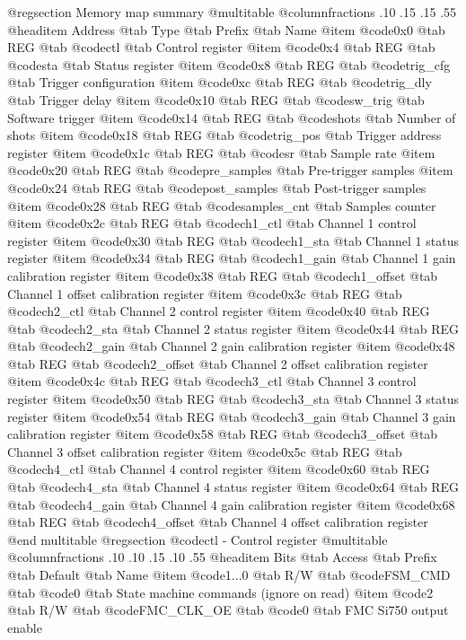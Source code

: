 @regsection Memory map summary
@multitable  @columnfractions .10 .15 .15 .55
@headitem Address @tab Type @tab Prefix @tab Name
@item @code{0x0} @tab
REG @tab
@code{ctl} @tab
Control register
@item @code{0x4} @tab
REG @tab
@code{sta} @tab
Status register
@item @code{0x8} @tab
REG @tab
@code{trig_cfg} @tab
Trigger configuration
@item @code{0xc} @tab
REG @tab
@code{trig_dly} @tab
Trigger delay
@item @code{0x10} @tab
REG @tab
@code{sw_trig} @tab
Software trigger
@item @code{0x14} @tab
REG @tab
@code{shots} @tab
Number of shots
@item @code{0x18} @tab
REG @tab
@code{trig_pos} @tab
Trigger address register
@item @code{0x1c} @tab
REG @tab
@code{sr} @tab
Sample rate
@item @code{0x20} @tab
REG @tab
@code{pre_samples} @tab
Pre-trigger samples
@item @code{0x24} @tab
REG @tab
@code{post_samples} @tab
Post-trigger samples
@item @code{0x28} @tab
REG @tab
@code{samples_cnt} @tab
Samples counter
@item @code{0x2c} @tab
REG @tab
@code{ch1_ctl} @tab
Channel 1 control register
@item @code{0x30} @tab
REG @tab
@code{ch1_sta} @tab
Channel 1 status register
@item @code{0x34} @tab
REG @tab
@code{ch1_gain} @tab
Channel 1 gain calibration register
@item @code{0x38} @tab
REG @tab
@code{ch1_offset} @tab
Channel 1 offset calibration register
@item @code{0x3c} @tab
REG @tab
@code{ch2_ctl} @tab
Channel 2 control register
@item @code{0x40} @tab
REG @tab
@code{ch2_sta} @tab
Channel 2 status register
@item @code{0x44} @tab
REG @tab
@code{ch2_gain} @tab
Channel 2 gain calibration register
@item @code{0x48} @tab
REG @tab
@code{ch2_offset} @tab
Channel 2 offset calibration register
@item @code{0x4c} @tab
REG @tab
@code{ch3_ctl} @tab
Channel 3 control register
@item @code{0x50} @tab
REG @tab
@code{ch3_sta} @tab
Channel 3 status register
@item @code{0x54} @tab
REG @tab
@code{ch3_gain} @tab
Channel 3 gain calibration register
@item @code{0x58} @tab
REG @tab
@code{ch3_offset} @tab
Channel 3 offset calibration register
@item @code{0x5c} @tab
REG @tab
@code{ch4_ctl} @tab
Channel 4 control register
@item @code{0x60} @tab
REG @tab
@code{ch4_sta} @tab
Channel 4 status register
@item @code{0x64} @tab
REG @tab
@code{ch4_gain} @tab
Channel 4 gain calibration register
@item @code{0x68} @tab
REG @tab
@code{ch4_offset} @tab
Channel 4 offset calibration register
@end multitable 
@regsection @code{ctl} - Control register
@multitable @columnfractions .10 .10 .15 .10 .55
@headitem Bits @tab Access @tab Prefix @tab Default @tab Name
@item @code{1...0}
@tab R/W @tab
@code{FSM_CMD}
@tab @code{0} @tab 
State machine commands (ignore on read)
@item @code{2}
@tab R/W @tab
@code{FMC_CLK_OE}
@tab @code{0} @tab 
FMC Si750 output enable
